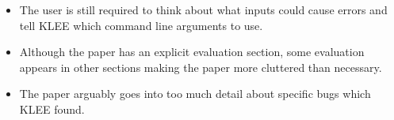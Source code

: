 \documentclass[11pt]{article}
\begin{document}
\begin{itemize}

    \item The user is still required to think about what inputs could cause
    errors and tell KLEE which command line arguments to use.

    \item Although the paper has an explicit evaluation section, some
    evaluation appears in other sections making the paper more cluttered than
    necessary.

    \item The paper arguably goes into too much detail about specific bugs
    which KLEE found.












\end{itemize}
\end{document}
